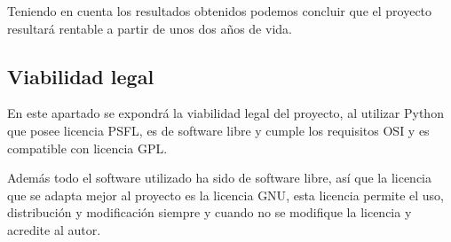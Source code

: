 	Teniendo en cuenta los resultados obtenidos podemos concluir que el proyecto resultará rentable a partir de unos dos años de vida.
	
\subsection{Viabilidad legal}

	En este apartado se expondrá la viabilidad legal del proyecto, al utilizar Python que posee licencia PSFL\cite{licencia}, es de software libre y cumple los requisitos OSI y es compatible con licencia GPL.
	
	Además todo el software utilizado ha sido de software libre, así que la licencia que se adapta mejor al proyecto es la licencia GNU\cite{gnu}, esta licencia permite el uso, distribución y modificación siempre y cuando no se modifique la licencia y acredite al autor.
	
	